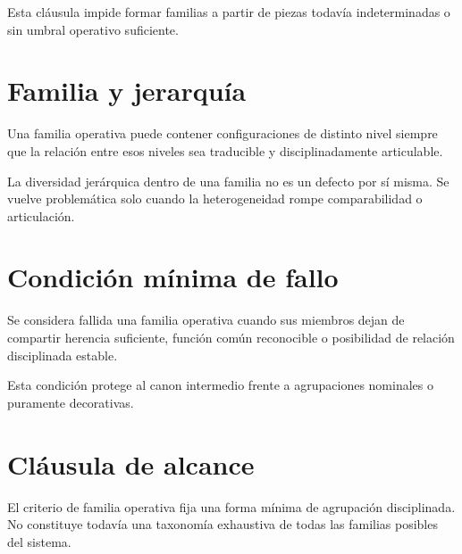 \begin{observation}
Esta cláusula impide formar familias a partir de piezas todavía indeterminadas o sin umbral operativo suficiente.
\end{observation}

\section{Familia y jerarquía}
\begin{definition}
Una familia operativa puede contener configuraciones de distinto nivel siempre que la relación entre esos niveles sea traducible y disciplinadamente articulable.
\end{definition}

\begin{observation}
La diversidad jerárquica dentro de una familia no es un defecto por sí misma. Se vuelve problemática solo cuando la heterogeneidad rompe comparabilidad o articulación.
\end{observation}

\section{Condición mínima de fallo}
\begin{definition}
Se considera fallida una familia operativa cuando sus miembros dejan de compartir herencia suficiente, función común reconocible o posibilidad de relación disciplinada estable.
\end{definition}

\begin{observation}
Esta condición protege al canon intermedio frente a agrupaciones nominales o puramente decorativas.
\end{observation}

\section{Cláusula de alcance}
\begin{observation}
El criterio de familia operativa fija una forma mínima de agrupación disciplinada. No constituye todavía una taxonomía exhaustiva de todas las familias posibles del sistema.
\end{observation}

